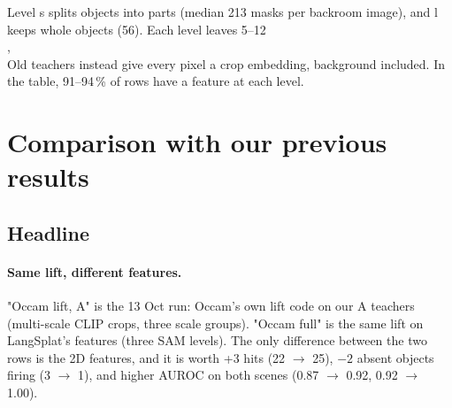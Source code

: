 \documentclass[11pt,a4paper]{article}
\begin{document}
\noindent Level s splits objects into parts (median 213 masks per backroom image), and l keeps whole objects (56). Each
level leaves 5--12\\,\\%
Old teachers instead give every pixel a crop embedding, background included. In the table, 91--94\,\% of rows have a
feature at each level.

\section{Comparison with our previous results}
\subsection{Headline}
\begin{table}[h]
\centering\small
\caption{Phase 5 evaluation, query settings unchanged since Phase 1. Per scene: hits, median and 90th-percentile
localisation error (m), absent objects returning a candidate, AUROC of peak relevancy (positives vs absent).}
\label{tab:headline}
\setlength{\tabcolsep}{3.2pt}
\end{table}

\paragraph{Same lift, different features.} "Occam lift, A" is the 13 Oct run: Occam's own lift code on our A
teachers (multi-scale CLIP crops, three scale groups). "Occam full" is the same lift on LangSplat's features (three SAM
levels). The only difference between the two rows is the 2D features, and it is worth +3 hits (22 $\to$ 25), $-2$ absent
objects firing (3 $\to$ 1), and higher AUROC on both scenes (0.87 $\to$ 0.92, 0.92 $\to$ 1.00).
\end{document}
